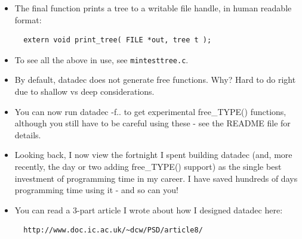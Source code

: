 \documentclass[handout,]{beamer}
\newcommand{\pitem}{\pause \item}
\begin{document}
\begin{frame}[fragile]
    \begin{itemize}
    \item
      The final function prints a tree to a writable file handle, in human
      readable format:
\begin{verbatim}
  extern void print_tree( FILE *out, tree t );
\end{verbatim}
    \pitem
     To see all the above in use, see \verb+mintesttree.c+.

    \pitem
      By default, \alert{datadec} does not generate free functions.  Why?
      \pause
      Hard to do right due to shallow vs deep considerations.

%


    \pitem
      You can now run \alert{datadec -f..} to get experimental
      \alert{free\_TYPE()} functions,
      although you still have to be careful using these -
      see the README file for details.

%

    \pitem
     Looking back, I now view the \alert{fortnight} I spent building datadec
     (and, more recently, the day or two adding \alert{free\_TYPE()} support)
     as the \alert{single best investment of programming time} in my career.
     I have saved \alert{hundreds of days} programming time using it -
     \alert{and so can you!}

    \pitem
    You can read a 3-part article I wrote about how I designed datadec here:

\begin{verbatim}
  http://www.doc.ic.ac.uk/~dcw/PSD/article8/
\end{verbatim}

\end{itemize}
\end{frame}
\end{document}
